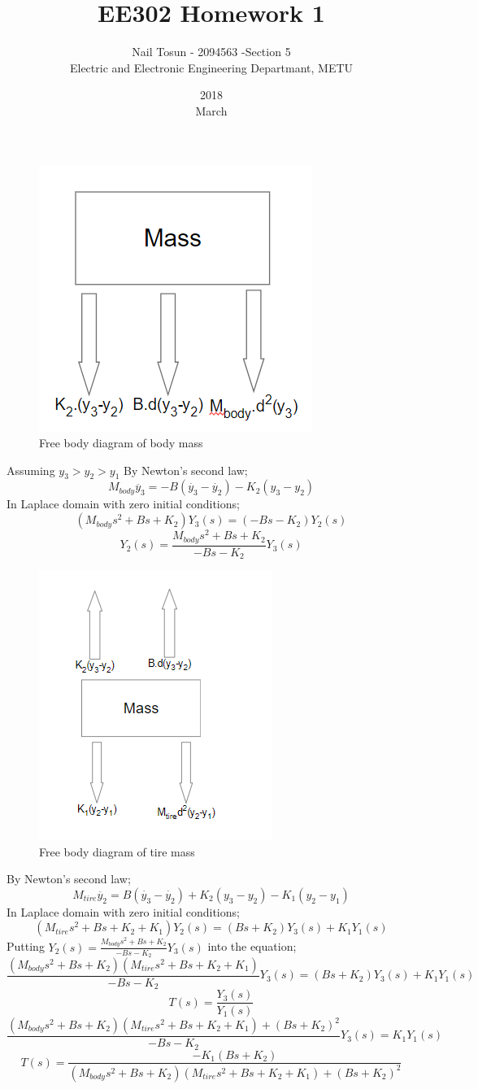 \documentclass[11pt]{article}
\title{EE302 Homework 1}
\date{2018\\ March}
\author{Nail Tosun - 2094563 -Section 5\\ Electric and Electronic Engineering Departmant, METU}
\begin{document}
\maketitle
\begin{figure}[H]
  \includegraphics[scale=0.5, center]{freenody}
  \caption{ Free body diagram of body mass}
  \label{fig:zero}
\end{figure}

Assuming $y_3 > y_2 > y_1$ By Newton's second law;
\[M_{body}\ddot{y_3}=-B(\dot{y_3}-\dot{y_2})-K_2(y_3-y_2) \]
In Laplace domain with zero initial conditions;
\[(M_{body}s^2+Bs+K_2)Y_3(s)=(-Bs-K_2)Y_2(s) \]
\[Y_2(s)=\frac{M_{body}s^2+Bs+K_2}{-Bs-K_2}Y_3(s) \]

\begin{figure}[H]
  \includegraphics[scale=0.7, center]{freenody2}
  \caption{Free body diagram of tire mass}
  \label{fig:zero}
\end{figure}
 By Newton's second law;
 \[M_{tire}\ddot{y_2}=B(\dot{y_3}-\dot{y_2})+K_2(y_3-y_2)-K_1(y_2-y_1)\]
 In Laplace domain with zero initial conditions;
 \[(M_{tire}s^2+Bs+K_2+K_1)Y_2(s)=(Bs+K_2)Y_3(s)+K_1Y_1(s)\]
 Putting $Y_2(s)=\frac{M_{body}s^2+Bs+K_2}{-Bs-K_2}Y_3(s)$ into the equation;
 \[\frac{(M_{body}s^2+Bs+K_2)(M_{tire}s^2+Bs+K_2+K_1)}{-Bs-K_2}Y_3(s)=(Bs+K_2)Y_3(s)+K_1Y_1(s)\]
 $$T(s)=\frac{Y_3(s)}{Y_1(s)}$$
 \[\frac{(M_{body}s^2+Bs+K_2)(M_{tire}s^2+Bs+K_2+K_1)+(Bs+K_2)^2}{-Bs-K_2}Y_3(s)= K_1Y_1(s)\]
$$T(s)=\frac{-K_1(Bs+K_2)}{(M_{body}s^2+Bs+K_2)(M_{tire}s^2+Bs+K_2+K_1)+(Bs+K_2)^2}$$
\end{document}
